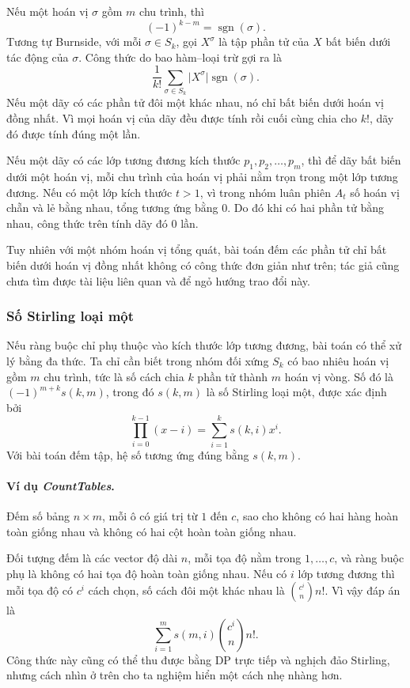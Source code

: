\documentclass[11pt]{article}
\begin{document}
Nếu một hoán vị \(\sigma\) gồm \(m\) chu trình, thì
\[
  (-1)^{k-m}=\operatorname{sgn}(\sigma).
\]
Tương tự Burnside, với mỗi \(\sigma\in S_k\), gọi \(X^\sigma\) là tập phần tử
của \(X\) bất biến dưới tác động của \(\sigma\). Công thức do bao
hàm--loại trừ gợi ra là
\[
  \frac{1}{k!}\sum_{\sigma\in S_k}\lvert X^\sigma\rvert
  \operatorname{sgn}(\sigma).
\]
Nếu một dãy có các phần tử đôi một khác nhau, nó chỉ bất biến dưới hoán vị đồng
nhất. Vì mọi hoán vị của dãy đều được tính rồi cuối cùng chia cho \(k!\), dãy
đó được tính đúng một lần.

Nếu một dãy có các lớp tương đương kích thước \(p_1,p_2,\ldots,p_m\), thì để
dãy bất biến dưới một hoán vị, mỗi chu trình của hoán vị phải nằm trọn trong
một lớp tương đương. Nếu có một lớp kích thước \(t>1\), vì trong nhóm luân
phiên \(A_t\) số hoán vị chẵn và lẻ bằng nhau, tổng tương ứng bằng \(0\). Do đó
khi có hai phần tử bằng nhau, công thức trên tính dãy đó \(0\) lần.

Tuy nhiên với một nhóm hoán vị tổng quát, bài toán đếm các phần tử chỉ bất biến
dưới hoán vị đồng nhất không có công thức đơn giản như trên; tác giả cũng chưa
tìm được tài liệu liên quan và để ngỏ hướng trao đổi này.

\subsubsection{Số Stirling loại một}

Nếu ràng buộc chỉ phụ thuộc vào kích thước lớp tương đương, bài toán có thể xử
lý bằng đa thức. Ta chỉ cần biết trong nhóm đối xứng \(S_k\) có bao nhiêu hoán
vị gồm \(m\) chu trình, tức là số cách chia \(k\) phần tử thành \(m\) hoán vị
vòng. Số đó là \((-1)^{m+k}s(k,m)\), trong đó \(s(k,m)\) là số Stirling loại
một, được xác định bởi
\[
  \prod_{i=0}^{k-1}(x-i)=\sum_{i=1}^{k}s(k,i)x^i.
\]
Với bài toán đếm tập, hệ số tương ứng đúng bằng \(s(k,m)\).

\paragraph{Ví dụ \emph{CountTables}.}
Đếm số bảng \(n\times m\), mỗi ô có giá trị từ \(1\) đến \(c\), sao cho không
có hai hàng hoàn toàn giống nhau và không có hai cột hoàn toàn giống nhau.

Đối tượng đếm là các vector độ dài \(n\), mỗi tọa độ nằm trong \(1,\ldots,c\),
và ràng buộc phụ là không có hai tọa độ hoàn toàn giống nhau. Nếu có \(i\) lớp
tương đương thì mỗi tọa độ có \(c^i\) cách chọn, số cách đôi một khác nhau là
\(\binom{c^i}{n}n!\). Vì vậy đáp án là
\[
  \sum_{i=1}^{m}s(m,i)\binom{c^i}{n}n!.
\]
Công thức này cũng có thể thu được bằng DP trực tiếp và nghịch đảo Stirling,
nhưng cách nhìn ở trên cho ta nghiệm hiển một cách nhẹ nhàng hơn.
\end{document}
